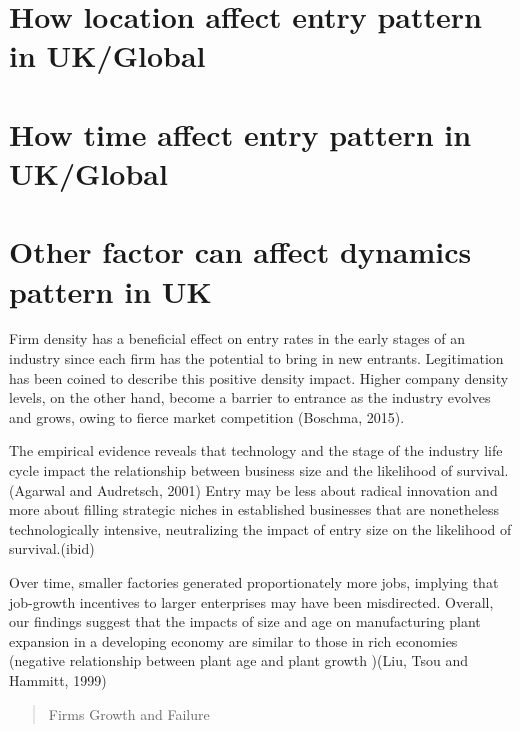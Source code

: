 \documentclass[
  12pt,
  oneside]{book}
\begin{document}
\hypertarget{how-location-affect-entry-pattern-in-ukglobal}{%
\section{How location affect entry pattern in UK/Global}\label{how-location-affect-entry-pattern-in-ukglobal}}

\hypertarget{how-time-affect-entry-pattern-in-ukglobal}{%
\section{How time affect entry pattern in UK/Global}\label{how-time-affect-entry-pattern-in-ukglobal}}

\hypertarget{other-factor-can-affect-dynamics-pattern-in-uk}{%
\section{Other factor can affect dynamics pattern in UK}\label{other-factor-can-affect-dynamics-pattern-in-uk}}

Firm density has a beneficial effect on entry rates in the early stages of an industry since each firm has the potential to bring in new entrants. Legitimation has been coined to describe this positive density impact. Higher company density levels, on the other hand, become a barrier to entrance as the industry evolves and grows, owing to fierce market competition (Boschma, 2015).

The empirical evidence reveals that technology and the stage of the industry life cycle impact the relationship between business size and the likelihood of survival.(Agarwal and Audretsch, 2001)
Entry may be less about radical innovation and more about filling strategic niches in established businesses that are nonetheless technologically intensive, neutralizing the impact of entry size on the likelihood of survival.(ibid)

Over time, smaller factories generated proportionately more jobs, implying that job-growth incentives to larger enterprises may have been misdirected. Overall, our findings suggest that the impacts of size and age on manufacturing plant expansion in a developing economy are similar to those in rich economies (negative relationship between plant age and plant growth )(Liu, Tsou and Hammitt, 1999)

\begin{quote}
Firms Growth and Failure
\end{quote}
\end{document}
